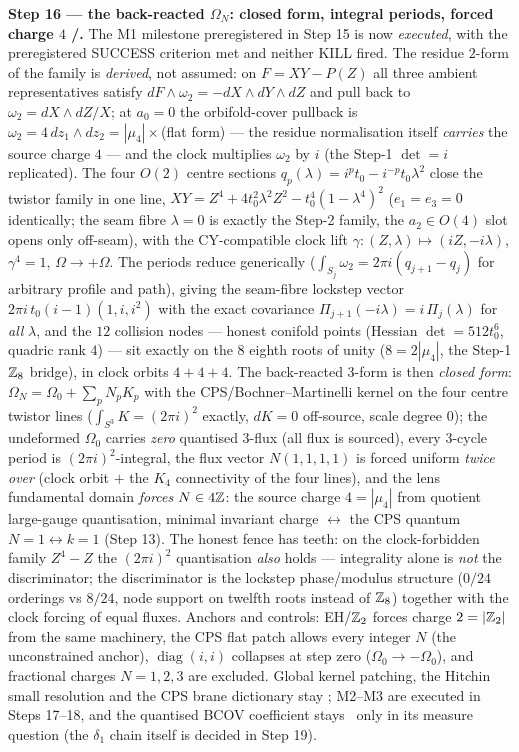 
\par\smallskip\noindent\textbf{Step 16 --- the back-reacted $\Omega_N$: closed form, integral
periods, forced charge $4$ \mE/\mC.} The M1 milestone preregistered in Step 15 is now
\emph{executed}, with the preregistered SUCCESS criterion met and neither KILL fired. The residue
$2$-form of the family is \emph{derived}, not assumed: on $F=XY-P(Z)$ all three ambient
representatives satisfy $dF\wedge\omega_2=-dX{\wedge}dY{\wedge}dZ$ and pull back to
$\omega_2=dX{\wedge}dZ/X$; at $a_0=0$ the orbifold-cover pullback is
$\omega_2=4\,dz_1{\wedge}dz_2=|\mu_4|\times$(flat form) --- the residue normalisation itself
\emph{carries} the source charge $4$ --- and the clock multiplies $\omega_2$ by $i$ (the Step-1
$\det=i$ replicated). The four $O(2)$ centre sections $q_p(\lambda)=i^pt_0-i^{-p}t_0\lambda^2$
close the twistor family in one line, $XY=Z^4+4t_0^2\lambda^2Z^2-t_0^4(1-\lambda^4)^2$
($e_1=e_3=0$ identically; the seam fibre $\lambda=0$ is exactly the Step-2 family, the
$a_2\in O(4)$ slot opens only off-seam), with the CY-compatible clock lift
$\gamma:(Z,\lambda)\mapsto(iZ,-i\lambda)$, $\gamma^4=1$, $\Omega\to+\Omega$. The periods reduce
generically ($\int_{S_j}\omega_2=2\pi i(q_{j+1}-q_j)$ for arbitrary profile and path), giving the
seam-fibre lockstep vector $2\pi i\,t_0(i-1)(1,i,i^2)$ with the exact covariance
$\Pi_{j+1}(-i\lambda)=i\,\Pi_j(\lambda)$ for \emph{all} $\lambda$, and the $12$ collision nodes
--- honest conifold points (Hessian $\det=512t_0^6$, quadric rank $4$) --- sit exactly on the
$8$ eighth roots of unity ($8=2|\mu_4|$, the Step-1 $\mathbb{Z}_8$ bridge), in clock orbits $4{+}4{+}4$.
The back-reacted $3$-form is then \emph{closed form}: $\Omega_N=\Omega_0+\sum_pN_pK_p$ with the
CPS/Bochner--Martinelli kernel on the four centre twistor lines ($\int_{S^3}K=(2\pi i)^2$
exactly, $dK=0$ off-source, scale degree $0$); the undeformed $\Omega_0$ carries \emph{zero}
quantised $3$-flux (all flux is sourced), every $3$-cycle period is $(2\pi i)^2$-integral, the
flux vector $N(1,1,1,1)$ is forced uniform \emph{twice over} (clock orbit $+$ the $K_4$
connectivity of the four lines), and the lens fundamental domain \emph{forces} $N\in4\mathbb{Z}$: the
source charge $4=|\mu_4|$ from quotient large-gauge quantisation, minimal invariant charge
$\leftrightarrow$ the CPS quantum $N=1\leftrightarrow k=1$ (Step 13). The honest fence has
teeth: on the clock-forbidden family $Z^4-Z$ the $(2\pi i)^2$ quantisation \emph{also} holds ---
integrality alone is \emph{not} the discriminator; the discriminator is the lockstep
phase/modulus structure ($0/24$ orderings vs $8/24$, node support on twelfth roots instead of
$\mathbb{Z}_8$) together with the clock forcing of equal fluxes. Anchors and controls: EH/$\mathbb{Z}_2$ forces
charge $2=|\mathbb{Z}_2|$ from the same machinery, the CPS flat patch allows every integer $N$ (the
unconstrained anchor), $\operatorname{diag}(i,i)$ collapses at step zero
($\Omega_0\to-\Omega_0$), and fractional charges $N=1,2,3$ are excluded. Global kernel
patching, the Hitchin small resolution and the CPS brane dictionary stay \mC; M2--M3 are
executed in Steps 17--18, and the quantised BCOV coefficient stays \mO\ only in its measure
question (the $\delta_1$ chain itself is decided in Step 19).


